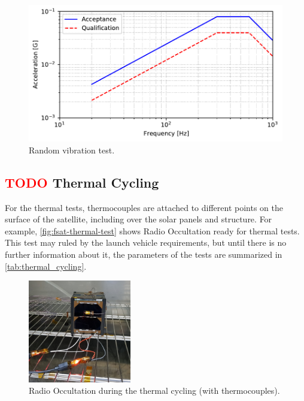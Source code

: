 \begin{figure}[!htb]
    \begin{center}
        \includegraphics[width=\textwidth]{curves/random_vibration.pdf}
        \caption{Random vibration test.}
        \label{fig:vibration-random}
    \end{center}
\end{figure}

\subsection{ \textcolor{red}{TODO} Thermal Cycling}

For the thermal tests, thermocouples are attached to different points on the surface of the satellite, including over the solar panels and structure. For example, \autoref{fig:fsat-thermal-test} shows Radio Occultation ready for thermal tests. This test may ruled by the launch vehicle requirements, but until there is no further information about it, the parameters of the tests are summarized in \autoref{tab:thermal_cycling}.

\begin{figure}[!htb]
    \begin{center}
        \includegraphics[width=0.4\textwidth]{figures/fsat_fm_thermal_cycling.jpg}
        \caption{Radio Occultation during the thermal cycling (with thermocouples).}
        \label{fig:fsat-thermal-test}
    \end{center}
\end{figure}

